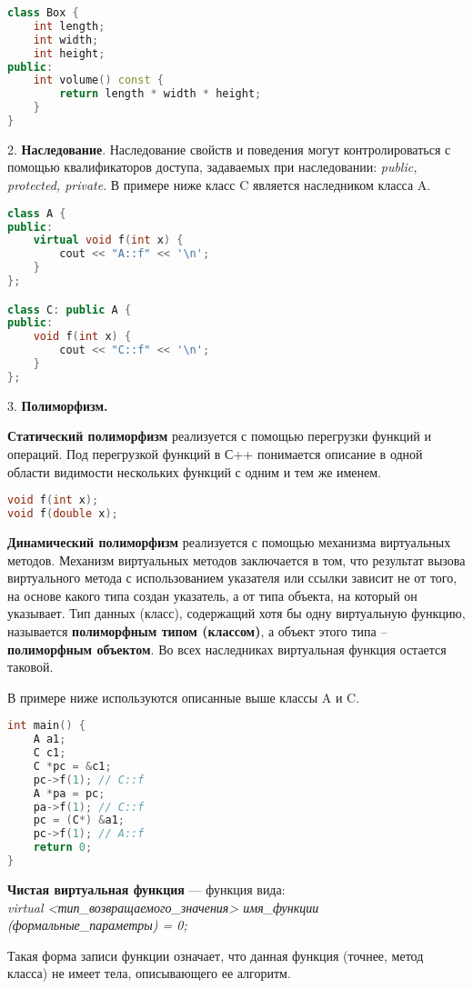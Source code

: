 \begin{lstlisting}[language=C++]
class Box { 
    int length;
    int width;
    int height; 
public:
    int volume() const {
        return length * width * height;
    }
}
\end{lstlisting}

2. \textbf{Наследование}.
Наследование свойств и поведения могут контролироваться с помощью квалификаторов доступа, задаваемых при наследовании: \textit{public, protected, private}.  В примере ниже класс C является наследником класса A.

\begin{lstlisting}[language=C++]
class A { 
public:
    virtual void f(int x) { 
        cout << "A::f" << '\n';
    }
};

class C: public A {
public:
    void f(int x) {
        cout << "C::f" << '\n';
    }
};
\end{lstlisting}

3. \textbf{Полиморфизм.}

\textbf{Статический полиморфизм} реализуется с помощью перегрузки функций и операций. Под перегрузкой функций в С++ понимается описание в одной области видимости нескольких функций с одним и тем же именем.
\begin{lstlisting}[language=C++]
void f(int x);
void f(double x);
\end{lstlisting}
\textbf{Динамический полиморфизм} реализуется с помощью механизма виртуальных методов.
Механизм виртуальных методов заключается в том, что результат вызова виртуального метода с использованием указателя или ссылки зависит не от того, на основе какого типа создан указатель, а от типа объекта, на который он указывает. Тип данных (класс), содержащий хотя бы одну виртуальную функцию, называется \textbf{полиморфным типом (классом)}, а объект этого типа – \textbf{полиморфным объектом}. Во всех наследниках виртуальная функция остается таковой.

В примере ниже используются описанные выше классы A и C.
\begin{lstlisting}[language=C++]
int main() { 
    A a1;
    C c1;
    C *pc = &c1;
    pc->f(1); // C::f
    A *pa = pc;
    pa->f(1); // C::f
    pc = (C*) &a1;
    pc->f(1); // A::f
    return 0;
}
\end{lstlisting}
\textbf{Чистая виртуальная функция} --- функция вида: \\
\textit{virtual <тип\_возвращаемого\_значения> имя\_функции (формальные\_параметры) = 0;}

Такая форма записи функции означает, что данная функция (точнее, метод класса) не имеет тела, описывающего ее алгоритм.

